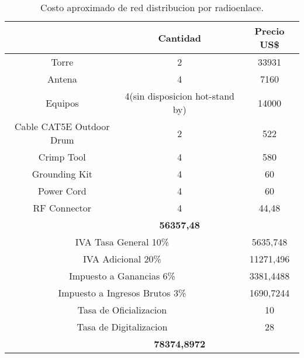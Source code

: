 \begin{table}[htbp]
  \centering
    \begin{tabular}{|cc|c}
    \hline
    \rowcolor[rgb]{ .773,  .851,  .945} \multicolumn{1}{|c|}{\textbf{Articulo}} & \textbf{Cantidad} & \multicolumn{1}{c|}{\textbf{Precio US\$}} \bigstrut\\
    \hline
    \multicolumn{1}{|p{13.22em}|}{Torre} & 2     & \multicolumn{1}{c|}{33931} \bigstrut\\
    \hline
    \multicolumn{1}{|p{13.22em}|}{Antena} & 4     & \multicolumn{1}{c|}{7160} \bigstrut\\
    \hline
    \multicolumn{1}{|p{13.22em}|}{Equipos} & \multicolumn{1}{p{10.555em}|}{4(sin disposicion hot-stand by)} & \multicolumn{1}{c|}{14000} \bigstrut\\
    \hline
    \multicolumn{1}{|p{13.22em}|}{Cable CAT5E Outdoor Drum} & 2     & \multicolumn{1}{c|}{522} \bigstrut\\
    \hline
    \multicolumn{1}{|p{13.22em}|}{Crimp Tool} & 4     & \multicolumn{1}{c|}{580} \bigstrut\\
    \hline
    \multicolumn{1}{|p{13.22em}|}{Grounding Kit} & 4     & \multicolumn{1}{c|}{60} \bigstrut\\
    \hline
    \multicolumn{1}{|p{13.22em}|}{Power Cord} & 4     & \multicolumn{1}{c|}{60} \bigstrut\\
    \hline
    \multicolumn{1}{|p{13.22em}|}{RF Connector} & 4     & \multicolumn{1}{c|}{44,48} \bigstrut\\
    \hline
    \rowcolor[rgb]{ .773,  .851,  .945} \multicolumn{2}{|c|}{\textbf{Costo}} & \multicolumn{1}{c|}{\textbf{56357,48}} \bigstrut\\
    \hline
    \multicolumn{2}{|p{23.775em}|}{IVA Tasa General 10\%} & \multicolumn{1}{c|}{5635,748} \bigstrut\\
    \hline
    \multicolumn{2}{|p{23.775em}|}{IVA Adicional 20\%} & \multicolumn{1}{c|}{11271,496} \bigstrut\\
    \hline
    \multicolumn{2}{|p{23.775em}|}{Impuesto a Ganancias 6\%} & \multicolumn{1}{c|}{3381,4488} \bigstrut\\
    \hline
    \multicolumn{2}{|p{23.775em}|}{Impuesto a Ingresos Brutos 3\%} & \multicolumn{1}{c|}{1690,7244} \bigstrut\\
    \hline
    \multicolumn{2}{|p{23.775em}|}{Tasa de Oficializacion} & \multicolumn{1}{c|}{10} \bigstrut\\
    \hline
    \multicolumn{2}{|p{23.775em}|}{Tasa de Digitalizacion} & \multicolumn{1}{c|}{28} \bigstrut\\
    \hline
    \rowcolor[rgb]{ .773,  .851,  .945} \multicolumn{2}{|c|}{\textbf{Total}} & \textbf{78374,8972} \bigstrut\\
    \hline
    \end{tabular}%
	\caption{Costo aproximado de red distribucion por radioenlace.}
  \label{tab:costo-aproximado-RE}%
\end{table}%


